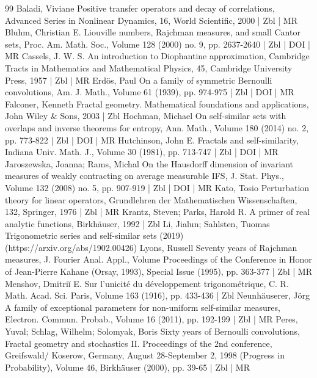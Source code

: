 \begin{thebibliography}{99}
Baladi, Viviane Positive transfer operators and decay of correlations, Advanced Series in Nonlinear Dynamics, 16, World Scientific, 2000 | Zbl | MR
Bluhm, Christian E. Liouville numbers, Rajchman measures, and small Cantor sets, Proc. Am. Math. Soc., Volume 128 (2000) no. 9, pp. 2637-2640 | Zbl | DOI | MR
Cassels, J. W. S. An introduction to Diophantine approximation, Cambridge Tracts in Mathematics and Mathematical Physics, 45, Cambridge University Press, 1957 | Zbl | MR
Erdös, Paul On a family of symmetric Bernoulli convolutions, Am. J. Math., Volume 61 (1939), pp. 974-975 | Zbl | DOI | MR
Falconer, Kenneth Fractal geometry. Mathematical foundations and applications, John Wiley \& Sons, 2003 | Zbl
Hochman, Michael On self-similar sets with overlaps and inverse theorems for entropy, Ann. Math., Volume 180 (2014) no. 2, pp. 773-822 | Zbl | DOI | MR
Hutchinson, John E. Fractals and self-similarity, Indiana Univ. Math. J., Volume 30 (1981), pp. 713-747 | Zbl | DOI | MR
Jaroszewska, Joanna; Rams, Michal On the Hausdorff dimension of invariant measures of weakly contracting on average measurable IFS, J. Stat. Phys., Volume 132 (2008) no. 5, pp. 907-919 | Zbl | DOI | MR
Kato, Tosio Perturbation theory for linear operators, Grundlehren der Mathematischen Wissenschaften, 132, Springer, 1976 | Zbl | MR
Krantz, Steven; Parks, Harold R. A primer of real analytic functions, Birkhäuser, 1992 | Zbl
Li, Jialun; Sahlsten, Tuomas Trigonometric series and self-similar sets (2019) (https://arxiv.org/abs/1902.00426)
Lyons, Russell Seventy years of Rajchman measures, J. Fourier Anal. Appl., Volume Proceedings of the Conference in Honor of Jean-Pierre Kahane (Orsay, 1993), Special Issue (1995), pp. 363-377 | Zbl | MR
Menshov, Dmitriĭ E. Sur l’unicité du développement trigonométrique, C. R. Math. Acad. Sci. Paris, Volume 163 (1916), pp. 433-436 | Zbl
Neunhäuserer, Jörg A family of exceptional parameters for non-uniform self-similar measures, Electron. Commun. Probab., Volume 16 (2011), pp. 192-199 | Zbl | MR
Peres, Yuval; Schlag, Wilhelm; Solomyak, Boris Sixty years of Bernoulli convolutions, Fractal geometry and stochastics II. Proceedings of the 2nd conference, Greifswald/ Koserow, Germany, August 28-September 2, 1998 (Progress in Probability), Volume 46, Birkhäuser (2000), pp. 39-65 | Zbl | MR

\end{thebibliography}
